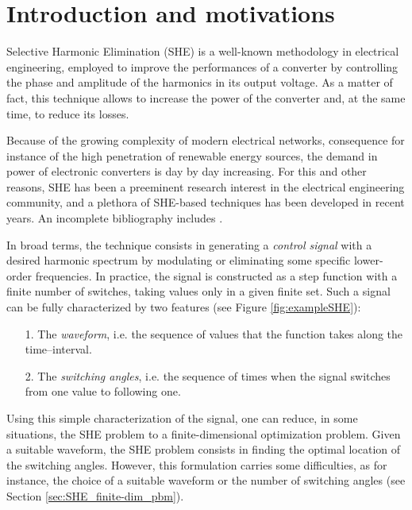 \documentclass[twocolumn]{autart}    %
\begin{document}
\section{Introduction and motivations}\label{Section1}

Selective Harmonic Elimination (SHE) \cite{Rodriguez2002} is a well-known methodology in electrical engineering, employed to improve the performances of a converter by controlling the phase and amplitude of the harmonics in its output voltage. As a matter of fact, this technique allows to increase the power of the converter and, at the same time, to reduce its losses. 
%

Because of the growing complexity of modern electrical networks, consequence for instance of the high penetration of renewable energy sources, the demand in power of electronic converters is day by day increasing. For this and other reasons, SHE has been a preeminent research interest in the electrical engineering community, and a plethora of SHE-based techniques has been developed in recent years. An incomplete bibliography includes \cite{duranay2017selective,Janabi2020,Yang2017}.

In broad terms, the technique consists in generating a \textit{control signal} with a desired harmonic spectrum by modulating or eliminating some specific lower-order frequencies.  
In practice, the signal is constructed as a step function with a finite number of switches, taking values only in a given finite set. 
Such a signal can be fully characterized by two features (see Figure \ref{fig:exampleSHE}): 
\begin{itemize}
	\item[1.] The \textit{waveform}, i.e. the sequence of values that the function takes along the time--interval.
	\item[2.] The \textit{switching angles}, i.e. the sequence of times when the signal switches from one value to following one. 
\end{itemize}
Using this simple characterization of the signal, one can reduce, in some situations, the SHE problem to a finite-dimensional optimization problem.
Given a suitable waveform, the SHE problem consists in finding the optimal location of the switching angles.
However, this formulation carries some difficulties,  as for instance, the choice of a suitable waveform or the number of switching angles (see Section \ref{sec:SHE_finite-dim_pbm}).  
\end{document}
